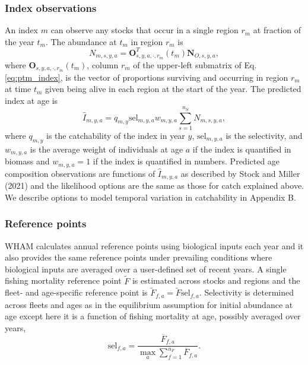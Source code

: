 \documentclass[
]{article}
\begin{document}
\hypertarget{index-observations}{%
\subsubsection*{Index observations}\label{index-observations}}

An index \(m\) can observe any stocks that occur in a single region \(r_m\) at fraction of the year \(t_m\). The abundance at \(t_m\) in region \(r_m\) is
\[N_{m,s,y,a} = \mathbf{O}_{s,y,a,\cdot,r_m}^T(t_m) \mathbf{N}_{O,s,y,a},\]
where \(\mathbf{O}_{s,y,a,\cdot,r_m}(t_m)\), column \(r_m\) of the upper-left submatrix of Eq. \ref{eq:ptm_index}, is the vector of proportions surviving and occurring in region \(r_m\) at time \(t_m\) given being alive in each region at the start of the year. The predicted index at age is
\[\widehat{I}_{m,y,a} = q_{m,y} \text{sel}_{m,y,a}w_{m,y,a}\sum^{n_S}_{s = 1}N_{m,s,y,a},\]
where \(q_{m,y}\) is the catchability of the index in year \(y\), \(\text{sel}_{m,y,a}\) is the selectivity, and \(w_{m,y,a}\) is the average weight of individuals at age \(a\) if the index is quantified in biomass and \(w_{m,y,a} = 1\) if the index is quantified in numbers. Predicted age composition observations are functions of \(\widehat{I}_{m,y,a}\) as described by Stock and Miller (2021) and the likelihood options are the same as those for catch explained above. We describe options to model temporal variation in catchability in Appendix B.

\hypertarget{reference-points}{%
\subsubsection*{Reference points}\label{reference-points}}

WHAM calculates annual reference points using biological inputs each year and it also provides the same reference points under prevailing conditions where biological inputs are averaged over a user-defined set of recent years. A single fishing mortality reference point \(\widetilde{F}\) is estimated across stocks and regions and the fleet- and age-specific reference point is \(\widetilde{F}_{f,a} = \widetilde{F} \text{sel}_{f,a}\). Selectivity is determined across fleets and ages as in the equilibrium assumption for initial abundance at age except here it is a function of fishing mortality at age, possibly averaged over years,
\begin{equation}\label{eq:spr_sel}
  \text{sel}_{f,a} = \frac{\overline{F}_{f,a}}{\max_a \sum^{n_F}_{f=1}{\overline{F}}_{f,a}}.
\end{equation}
\end{document}
